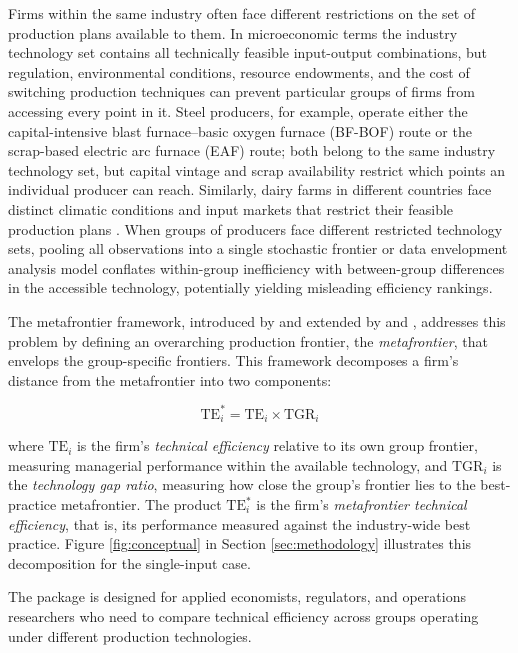 Firms within the same industry often face different restrictions on the set
of production plans available to them. In microeconomic terms the industry
technology set contains all technically feasible input-output combinations,
but regulation, environmental conditions, resource endowments, and the cost
of switching production techniques can prevent particular groups of firms
from accessing every point in it. Steel producers, for example, operate
either the capital-intensive blast furnace--basic oxygen furnace (BF-BOF)
route or the scrap-based electric arc furnace (EAF) route; both belong to
the same industry technology set, but capital vintage and scrap availability
restrict which points an individual producer can reach. Similarly, dairy
farms in different countries face distinct climatic conditions and input
markets that restrict their feasible production plans \citep{moreira2010}. When
groups of producers face different restricted technology sets, pooling all
observations into a single stochastic frontier or data envelopment analysis
model conflates within-group inefficiency with between-group differences in
the accessible technology, potentially yielding misleading efficiency
rankings.

The metafrontier framework, introduced by \citet{battese2004} and extended by
\citet{odonnell2008} and \citet{huang2014}, addresses this problem by defining an
overarching production frontier, the \emph{metafrontier}, that envelops the
group-specific frontiers. This framework decomposes a firm's distance from
the metafrontier into two components:

\begin{equation}
\text{TE}^*_i = \text{TE}_i \times \text{TGR}_i
\label{eq:decomposition}
\end{equation}

where \(\text{TE}_i\) is the firm's \emph{technical efficiency} relative to its own
group frontier, measuring managerial performance within the available
technology, and \(\text{TGR}_i\) is the \emph{technology gap ratio}, measuring how
close the group's frontier lies to the best-practice metafrontier. The product
\(\text{TE}^*_i\) is the firm's \emph{metafrontier technical efficiency}, that is,
its performance measured against the industry-wide best practice.
Figure \ref{fig:conceptual} in Section \ref{sec:methodology} illustrates this decomposition for
the single-input case.

The package is designed for applied economists, regulators, and
operations researchers who need to compare technical efficiency across
groups operating under different production technologies.


